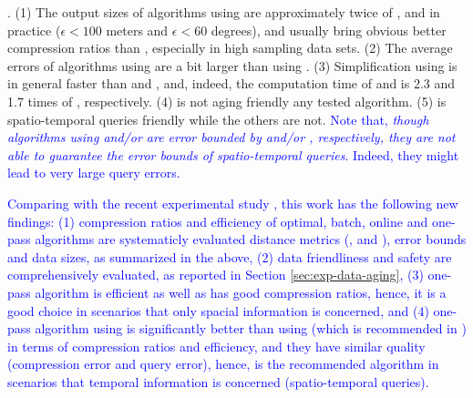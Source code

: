.
(1) The output sizes of algorithms using \sed are approximately twice of \ped, and in practice (\eg $\epsilon <100$ meters and $\epsilon < 60$ degrees), \ped and \sed usually bring obvious better compression ratios than \dad, especially in high sampling data sets.
%
(2) The average errors of algorithms using \sed are a bit larger than using \ped.
%
(3) Simplification using \dad is in general faster than \ped and \sed, and, indeed, the computation time of \ped and \sed is 2.3 and 1.7 times of \dad, respectively.
%
{(4) \dad is not aging friendly \wrt any tested algorithm.}
%
{(5) \sed is spatio-temporal queries friendly while the others are not. }
\textcolor{blue}{Note that, \emph{though algorithms using \ped and/or \dad are error bounded by \ped and/or \dad, respectively, they are not able to guarantee the error bounds of spatio-temporal queries}. Indeed, they might lead to very large query errors.}



\textcolor{blue}{Comparing with the recent experimental study \cite{Zhang:Evaluation}, this work has the following new findings: (1) compression ratios and efficiency of optimal, batch, online and one-pass algorithms are systematicly evaluated \wrt distance metrics (\ped, \sed and \dad), error bounds and data sizes, as summarized in the above, (2) data friendliness and safety are comprehensively evaluated, as reported in Section \ref{sec:exp-data-aging}, (3) one-pass algorithm \siped is efficient as well as has good compression ratios, hence, it is a good choice in scenarios that only spacial information is concerned, and (4) one-pass algorithm \cised using \sed is significantly better than \dagots using \lissed (which is recommended in \cite{Zhang:Evaluation}) in terms of compression ratios and efficiency, and they have similar quality (compression error and query error), hence, \cised is the recommended algorithm in scenarios that temporal information is concerned (\eg spatio-temporal queries). }




